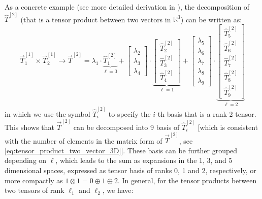 \begin{myquote}
\hspace{10pt} As a concrete example (see more detailed derivation in \citet{duval2023hitchhiker}), the decomposition of $\hat{T}^{[2]}$ (that is a tensor product between two vectors in $\mathbb{R}^3$) can be written as:
\begin{equation}
    \label{eq:rank_2_tensor_decomp}
    \vec{T}_1^{[1]}\times\vec{T}_2^{[1]}\to\vec{T}^{[2]} = \lambda_1\cdot \underbrace{\hat{T}_1^{[2]}}_{\ell=0}+\left[ \begin{array}{c}
         \lambda_2  \\
         \lambda_3 \\
         \lambda_4
    \end{array} \right] \cdot \underbrace{\left[ \begin{array}{c}
         \hat{T}_2^{[2]} \\
         \hat{T}_3^{[2]}  \\
         \hat{T}_4^{[2]} 
    \end{array} \right]}_{\ell=1} + \left[
    \begin{array}{c}
         \lambda_5  \\
         \lambda_6 \\
         \lambda_7 \\
         \lambda_8 \\
         \lambda_9
    \end{array} \right] \cdot \underbrace{\left[ \begin{array}{c}
         \hat{T}_5^{[2]} \\
         \hat{T}_6^{[2]}  \\
         \hat{T}_7^{[2]} \\
         \hat{T}_8^{[2]} \\
         \hat{T}_9^{[2]}
    \end{array} \right]}_{\ell=2}
\end{equation}
in which we use the symbol $\hat{T}^{[2]}_i$ to specify the $i$-th basis that is a rank-2 tensor. This shows that $\vec{T}^{[2]}$ can be decomposed into 9 basis of $\hat{T}^{[2]}_i$ [which is consistent with the number of elements in the matrix form of $\vec{T}^{[2]}$, see \cref{eq:tensor_product_two_vector_3D}]. These basis  can be further grouped depending on $\ell$, which leads to the sum as expansions in the 1, 3, and 5 dimensional spaces, expressed as tensor basis of ranks 0, 1 and 2, respectively, or more compactly as $1\otimes1=0\oplus1\oplus2$. In general, for the tensor products between two tensors of rank $\ell_1$ and $\ell_2$, we have:

\end{myquote}
